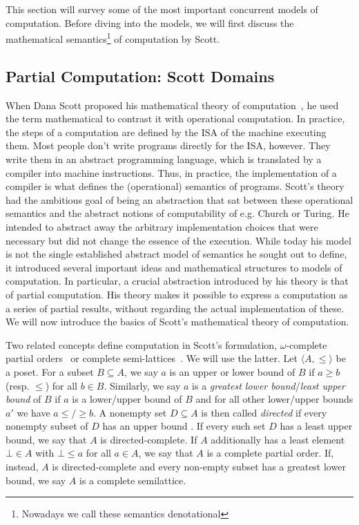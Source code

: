 This section will survey some of the most important concurrent models of computation. Before diving into the models, we will first discuss the mathematical semantics\footnote{Nowadays we call these semantics denotational} of computation by Scott.

\subsection{Partial Computation: Scott Domains}

When Dana Scott proposed his mathematical theory of computation~\cite{scott1970}, he used the term mathematical to contrast it with operational computation.
In practice, the steps of a computation are defined by the \ac{ISA} of the machine executing them.
Most people don't write programs directly for the \ac{ISA}, however. They write them in an abstract programming language, which is translated by a compiler into machine instructions.
Thus, in practice, the implementation of a compiler is what defines the (operational) semantics of programs.
Scott's theory had the ambitious goal of being an abstraction that sat between these operational semantics and the abstract notions of computability of e.g. Church or Turing.
He intended to abstract away the arbitrary implementation choices that were necessary but did not change the essence of the execution.
While today his model is not the single established abstract model of semantics he sought out to define, it introduced several important ideas and mathematical structures to models of computation.
In particular, a crucial abstraction introduced by his theory is that of partial computation.
His theory makes it possible to express a computation as a series of partial results, without regarding the actual implementation of these.
We will now introduce the basics of Scott's mathematical theory of computation.

Two related concepts define computation in Scott's formulation, $\omega$-complete partial orders~\cite{gunter} or complete semi-lattices~\cite{lee_matsikoudis_semantics}. 
We will use the latter.
Let $\langle A, \leq \rangle$ be a \ac{poset}. For a subset $B \subseteq A$, we say $a$ is an upper or lower bound of $B$ if $a \geq b$ (resp. $\leq$) for all $b \in B$. 
Similarly, we say $a$ is a \emph{greatest lower bound}/\emph{least upper bound} of $B$ if $a$ is a lower/upper bound of $B$ and for all other lower/upper bounds $a'$ we have $a \leq/\geq b$.
A nonempty set $D \subseteq A$ is then called \emph{directed} if every nonempty subset of $D$ has an upper bound . If every such set $D$ has a least upper bound, we say that $A$ is directed-complete.
If $A$ additionally has a least element $\bot \in A$ with $\bot \leq a$ for all $a \in A$, we say that $A$ is a complete partial order.
If, instead, $A$ is directed-complete and every non-empty subset has a greatest lower bound, we say $A$ is a complete semilattice.

